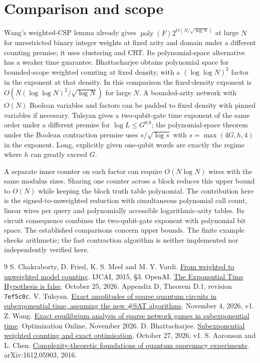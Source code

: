 \documentclass[11pt]{article}
\newcommand{\poly}{\operatorname{poly}}
\begin{document}
\section{Comparison and scope}
Wang's weighted-CSP lemma \cite[Lemma~1 and Remark~2]{wang} already gives $\poly(F)2^{O(N/\sqrt{\log N})}$ at large $N$ for unrestricted binary integer weights at fixed arity and domain under a different counting premise; it uses clustering and CRT. Its polynomial-space alternative has a weaker time guarantee. Bhattacharjee \cite[Theorem~5.3 and Lemma~5.5]{deep} obtains polynomial space for bounded-scope weighted counting at fixed density, with a $(\log\log N)^2$ factor in the exponent at that density. In this comparison the fixed-density exponent is $O(N(\log\log N)^2/\sqrt{\log N})$ for large $N$. A bounded-arity network with $O(N)$ Boolean variables and factors can be padded to fixed density with pinned variables if necessary. Tulsyan \cite[Theorems~1.1--1.2]{tulsyan} gives a two-qubit-gate time exponent of the same order under a different premise for $\log L\le G^{0.9}$; the polynomial-space theorem under the Boolean contraction premise uses $s/\sqrt{\log s}$ with $s=\max(4G,h,4)$ in the exponent. Long, explicitly given one-qubit words are exactly the regime where $h$ can greatly exceed $G$.

A separate inner counter on each factor can require $O(N\log N)$ wires with the same modulus sizes. Sharing one counter across a block reduces this upper bound to $O(N)$ while keeping the block truth table polynomial. The contribution here is the signed-to-unweighted reduction with simultaneous polynomial call count, linear wires per query and polynomially accessible logarithmic-arity tables. Its circuit consequence combines the two-qubit-gate exponent with polynomial bit space. The established comparisons concern upper bounds. The finite example checks arithmetic; the fast contraction algorithm is neither implemented nor independently verified here.

\begin{thebibliography}{9}
 S. Chakraborty, D. Fried, K. S. Meel and M. Y. Vardi.
\href{https://www.cs.rice.edu/~vardi/papers/ijcai15.pdf}{From weighted to unweighted model counting}. IJCAI, 2015, \S3.
 OpenAI. \href{https://github.com/openai/math/tree/7ef5c0cc5ca4b0e072b7a050fca09ab24bc6fa3a/preprints/The-Exponential-Time-Hypothesis-is-False-October-25-2026}{The Exponential Time Hypothesis is false}. October 25, 2026. Appendix D, Theorem D.1, revision \texttt{7ef5c0c}.
 V. Tulsyan. \href{https://hexagonmath.org/pdf/2611.00090v1}{Exact amplitudes of sparse quantum circuits in subexponential time, assuming the new \#SAT algorithms}. November 4, 2026, v1.
 Z. Wang. \href{https://optimization-online.org/wp-content/uploads/2026/11/main-1.pdf}{Exact equilibrium analysis of sparse network games in subexponential time}. Optimization Online, November 2026.
 D. Bhattacharjee. \href{https://hexagonmath.org/pdf/2610.00594v1}{Subexponential weighted counting and exact optimisation}. October 27, 2026, v1.
 S. Aaronson and L. Chen. \href{https://arxiv.org/abs/1612.05903}{Complexity-theoretic foundations of quantum supremacy experiments}. arXiv:1612.05903, 2016.
\end{thebibliography}
\end{document}

